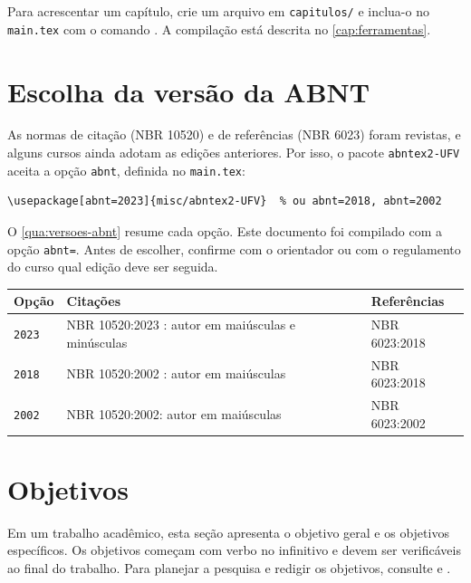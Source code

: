 Para acrescentar um capítulo, crie um arquivo em \texttt{capitulos/} e inclua-o no \texttt{main.tex} com o comando \verb||. A compilação está descrita no \autoref{cap:ferramentas}.

\section{Escolha da versão da ABNT}\label{sec:versao-abnt}

As normas de citação (NBR 10520) e de referências (NBR 6023) foram revistas, e alguns cursos ainda adotam as edições anteriores. Por isso, o pacote \texttt{abntex2-UFV} aceita a opção \texttt{abnt}, definida no \texttt{main.tex}:

\begin{verbatim}
\usepackage[abnt=2023]{misc/abntex2-UFV}  % ou abnt=2018, abnt=2002
\end{verbatim}

O \autoref{qua:versoes-abnt} resume cada opção. Este documento foi compilado com a opção \texttt{abnt=\imprimirversaoabnt}. Antes de escolher, confirme com o orientador ou com o regulamento do curso qual edição deve ser seguida.

\begin{quadro}[htbp]
	\caption{Versões da ABNT disponíveis no modelo}\label{qua:versoes-abnt}
	\centering
	\begin{tabular}{p{}p{}p{}}
		\toprule
		\textbf{Opção} & \textbf{Citações} & \textbf{Referências} \\
		\midrule
		\texttt{2023} & NBR 10520:2023 \cite{abnt10520}: autor em maiúsculas e minúsculas & NBR 6023:2018 \cite{abnt6023} \\
		\texttt{2018} & NBR 10520:2002 \cite{abnt10520-2002}: autor em maiúsculas & NBR 6023:2018 \\
		\texttt{2002} & NBR 10520:2002: autor em maiúsculas & NBR 6023:2002 \cite{abnt6023-2002} \\
		\bottomrule
	\end{tabular}
\end{quadro}

\section{Objetivos}\label{sec:objetivos}

Em um trabalho acadêmico, esta seção apresenta o objetivo geral e os objetivos específicos. Os objetivos começam com verbo no infinitivo e devem ser verificáveis ao final do trabalho. Para planejar a pesquisa e redigir os objetivos, consulte  e .

